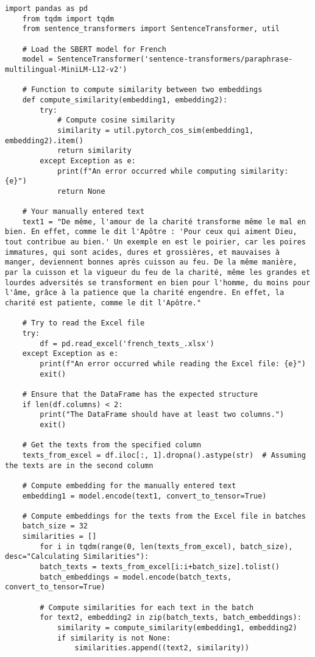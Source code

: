 \begin{lstlisting}[breaklines=true]
	import pandas as pd
	from tqdm import tqdm
	from sentence_transformers import SentenceTransformer, util
	
	# Load the SBERT model for French
	model = SentenceTransformer('sentence-transformers/paraphrase-multilingual-MiniLM-L12-v2')
	
	# Function to compute similarity between two embeddings
	def compute_similarity(embedding1, embedding2):
		try:
			# Compute cosine similarity
			similarity = util.pytorch_cos_sim(embedding1, embedding2).item()
			return similarity
		except Exception as e:
			print(f"An error occurred while computing similarity: {e}")
			return None
	
	# Your manually entered text
	text1 = "De même, l'amour de la charité transforme même le mal en bien. En effet, comme le dit l'Apôtre : 'Pour ceux qui aiment Dieu, tout contribue au bien.' Un exemple en est le poirier, car les poires immatures, qui sont acides, dures et grossières, et mauvaises à manger, deviennent bonnes après cuisson au feu. De la même manière, par la cuisson et la vigueur du feu de la charité, même les grandes et lourdes adversités se transforment en bien pour l'homme, du moins pour l'âme, grâce à la patience que la charité engendre. En effet, la charité est patiente, comme le dit l'Apôtre."
	
	# Try to read the Excel file
	try:
		df = pd.read_excel('french_texts_.xlsx')
	except Exception as e:
		print(f"An error occurred while reading the Excel file: {e}")
		exit()
	
	# Ensure that the DataFrame has the expected structure
	if len(df.columns) < 2:
		print("The DataFrame should have at least two columns.")
		exit()
	
	# Get the texts from the specified column
	texts_from_excel = df.iloc[:, 1].dropna().astype(str)  # Assuming the texts are in the second column
	
	# Compute embedding for the manually entered text
	embedding1 = model.encode(text1, convert_to_tensor=True)
	
	# Compute embeddings for the texts from the Excel file in batches
	batch_size = 32
	similarities = []
		for i in tqdm(range(0, len(texts_from_excel), batch_size), desc="Calculating Similarities"):
		batch_texts = texts_from_excel[i:i+batch_size].tolist()
		batch_embeddings = model.encode(batch_texts, convert_to_tensor=True)
	
		# Compute similarities for each text in the batch
		for text2, embedding2 in zip(batch_texts, batch_embeddings):
			similarity = compute_similarity(embedding1, embedding2)
			if similarity is not None:
				similarities.append((text2, similarity))
	

\end{lstlisting}
